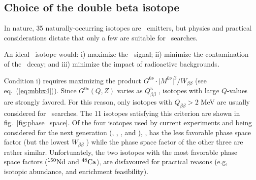 
\subsection{Choice of the double beta isotope} \label{subsec:isotope}
In nature, 35 naturally-occurring isotopes are \bb\ emitters, but physics and practical considerations dictate that only a few are suitable for \bbonu\ searches.

An ideal \bb\ isotope would: i) maximize the \bbonu\ signal; ii) minimize the contamination of the \bbtnu\ decay; and iii) minimize the impact of radioactive backgrounds. 

Condition i) requires 
%
%
maximizing the product $G^{0\nu}\cdot\lvert M^{0\nu}\rvert^2/W_{\beta\beta}$ (see eq.~(\ref{eq:mbbx4})). Since $G^{0\nu}(Q,Z)$ varies as $Q_{\beta\beta}^5$ \cite{Vogel:2008sx}, isotopes with large $Q$-values are strongly favored. For this reason, only isotopes with $Q_{\beta\beta}>2$ MeV are usually considered for \bbonu\ searches. The 11 isotopes satisfying this criterion are shown in fig.~\ref{fig:phase_space}. Of the four isotopes used by current experiments and being considered for the next generation (, , , and ),
, has the less favorable phase space factor (but the lowest $W_{\beta\beta}$ ) while the phase space factor of the other three are rather similar. Unfortunately, the two isotopes with
the most favorable phase space factors (${\rm ^{150}Nd}$ and ${\rm ^{48}Ca}$), are disfavoured for practical reasons (e.g, isotopic abundance, and enrichment feasibility).  

